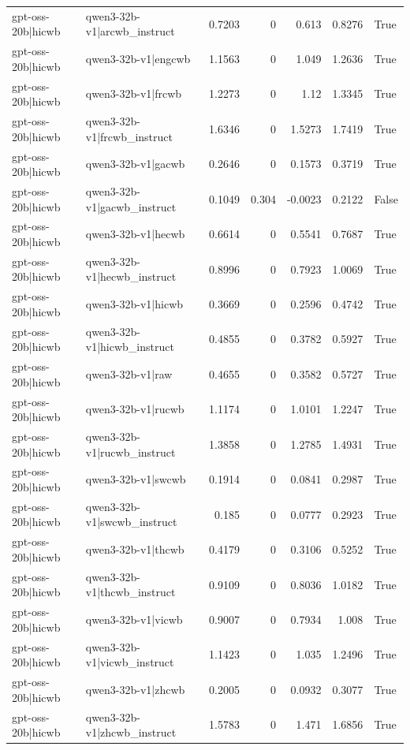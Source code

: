 \begin{table}
\begin{tabular}{l l r r r r l}
gpt-oss-20b|hicwb & qwen3-32b-v1|arcwb_instruct & 0.7203 & 0 & 0.613 & 0.8276 & True \\
gpt-oss-20b|hicwb & qwen3-32b-v1|engcwb & 1.1563 & 0 & 1.049 & 1.2636 & True \\
gpt-oss-20b|hicwb & qwen3-32b-v1|frcwb & 1.2273 & 0 & 1.12 & 1.3345 & True \\
gpt-oss-20b|hicwb & qwen3-32b-v1|frcwb_instruct & 1.6346 & 0 & 1.5273 & 1.7419 & True \\
gpt-oss-20b|hicwb & qwen3-32b-v1|gacwb & 0.2646 & 0 & 0.1573 & 0.3719 & True \\
gpt-oss-20b|hicwb & qwen3-32b-v1|gacwb_instruct & 0.1049 & 0.304 & -0.0023 & 0.2122 & False \\
gpt-oss-20b|hicwb & qwen3-32b-v1|hecwb & 0.6614 & 0 & 0.5541 & 0.7687 & True \\
gpt-oss-20b|hicwb & qwen3-32b-v1|hecwb_instruct & 0.8996 & 0 & 0.7923 & 1.0069 & True \\
gpt-oss-20b|hicwb & qwen3-32b-v1|hicwb & 0.3669 & 0 & 0.2596 & 0.4742 & True \\
gpt-oss-20b|hicwb & qwen3-32b-v1|hicwb_instruct & 0.4855 & 0 & 0.3782 & 0.5927 & True \\
gpt-oss-20b|hicwb & qwen3-32b-v1|raw & 0.4655 & 0 & 0.3582 & 0.5727 & True \\
gpt-oss-20b|hicwb & qwen3-32b-v1|rucwb & 1.1174 & 0 & 1.0101 & 1.2247 & True \\
gpt-oss-20b|hicwb & qwen3-32b-v1|rucwb_instruct & 1.3858 & 0 & 1.2785 & 1.4931 & True \\
gpt-oss-20b|hicwb & qwen3-32b-v1|swcwb & 0.1914 & 0 & 0.0841 & 0.2987 & True \\
gpt-oss-20b|hicwb & qwen3-32b-v1|swcwb_instruct & 0.185 & 0 & 0.0777 & 0.2923 & True \\
gpt-oss-20b|hicwb & qwen3-32b-v1|thcwb & 0.4179 & 0 & 0.3106 & 0.5252 & True \\
gpt-oss-20b|hicwb & qwen3-32b-v1|thcwb_instruct & 0.9109 & 0 & 0.8036 & 1.0182 & True \\
gpt-oss-20b|hicwb & qwen3-32b-v1|vicwb & 0.9007 & 0 & 0.7934 & 1.008 & True \\
gpt-oss-20b|hicwb & qwen3-32b-v1|vicwb_instruct & 1.1423 & 0 & 1.035 & 1.2496 & True \\
gpt-oss-20b|hicwb & qwen3-32b-v1|zhcwb & 0.2005 & 0 & 0.0932 & 0.3077 & True \\
gpt-oss-20b|hicwb & qwen3-32b-v1|zhcwb_instruct & 1.5783 & 0 & 1.471 & 1.6856 & True \\

\end{tabular}
\end{table}
